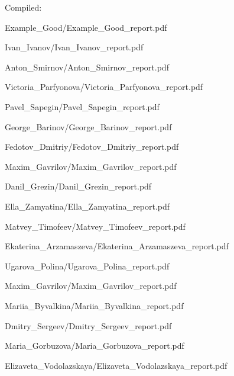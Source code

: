 \documentclass[a4paper]{article}
\begin{document}
Compiled: \DTMnow
\tableofcontents

\clearpage

{Example_Good/Example_Good_report.pdf}

{Ivan_Ivanov/Ivan_Ivanov_report.pdf}

{Anton_Smirnov/Anton_Smirnov_report.pdf}

{Victoria_Parfyonova/Victoria_Parfyonova_report.pdf}

{Pavel_Sapegin/Pavel_Sapegin_report.pdf}

{George_Barinov/George_Barinov_report.pdf}

{Fedotov_Dmitriy/Fedotov_Dmitriy_report.pdf}

{Maxim_Gavrilov/Maxim_Gavrilov_report.pdf}

{Danil_Grezin/Danil_Grezin_report.pdf}

{Ella_Zamyatina/Ella_Zamyatina_report.pdf}

{Matvey_Timofeev/Matvey_Timofeev_report.pdf}

{Ekaterina_Arzamaszeva/Ekaterina_Arzamaszeva_report.pdf}

{Ugarova_Polina/Ugarova_Polina_report.pdf}

{Maxim_Gavrilov/Maxim_Gavrilov_report.pdf}

{Mariia_Byvalkina/Mariia_Byvalkina_report.pdf}

{Dmitry_Sergeev/Dmitry_Sergeev_report.pdf}

{Maria_Gorbuzova/Maria_Gorbuzova_report.pdf}

{Elizaveta_Vodolazskaya/Elizaveta_Vodolazskaya_report.pdf}
\end{document}

